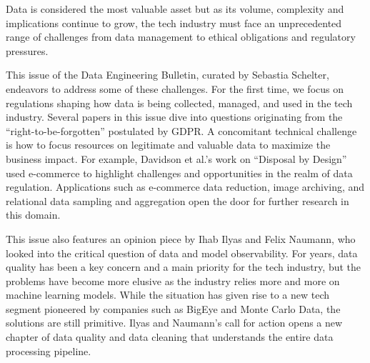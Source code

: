 \documentclass[11pt]{article}
\begin{document}
Data is considered the most valuable asset but as its volume,
complexity and implications continue to grow, the tech industry must
face an unprecedented range of challenges from data management to
ethical obligations and regulatory pressures.

This issue of the Data Engineering Bulletin, curated by Sebastia
Schelter, endeavors to address some of these challenges. For the first
time, we focus on regulations shaping how data is being collected,
managed, and used in the tech industry. Several papers in this issue
dive into questions originating from the ``right-to-be-forgotten''
postulated by GDPR. A concomitant technical challenge is how to focus
resources on legitimate and valuable data to maximize the business
impact. For example, Davidson et al.'s work on ``Disposal by Design''
used e-commerce to highlight challenges and opportunities in the realm
of data regulation. Applications such as e-commerce data reduction,
image archiving, and relational data sampling and aggregation open the
door for further research in this domain.

This issue also features an opinion piece by Ihab Ilyas and Felix
Naumann, who looked into the critical question of data and model
observability. For years, data quality has been a key concern and a
main priority for the tech industry, but the problems have become more
elusive as the industry relies more and more on machine learning
models. While the situation has given rise to a new tech segment
pioneered by companies such as BigEye and Monte Carlo Data, the
solutions are still primitive. Ilyas and Naumann's call for action
opens a new chapter of data quality and data cleaning that understands
the entire data processing pipeline.
\end{document}
